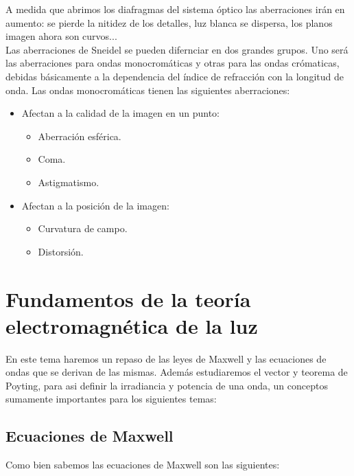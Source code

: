 \documentclass[12pt,a4paper]{article}
\numberwithin{equation}{section}
\numberwithin{figure}{section}
\begin{document}
A medida que abrimos los diafragmas del sistema óptico las aberraciones irán en aumento: se pierde la nitidez de los detalles, luz blanca se dispersa, los planos imagen ahora son curvos... \\

Las aberraciones de Sneidel se pueden difernciar en dos grandes grupos. Uno será las aberraciones para ondas monocromáticas y otras para las ondas crómaticas, debidas básicamente a la dependencia del índice de refracción con la longitud de onda. Las ondas monocromáticas tienen las siguientes aberraciones:

\begin{itemize}
\item Afectan a la calidad de la imagen en un punto:
\begin{itemize}
\item Aberración esférica.
\item Coma.
\item Astigmatismo.
\end{itemize}
\item Afectan a la posición de la imagen:
\begin{itemize}
\item Curvatura de campo.
\item Distorsión.
\end{itemize}
\end{itemize}

\newpage

\section{Fundamentos de la teoría electromagnética de la luz}

En este tema haremos un repaso de las leyes de Maxwell y las ecuaciones de ondas que se derivan de las mismas. Además estudiaremos el vector y teorema de Poyting, para asi definir la irradiancia y potencia de una onda, un conceptos sumamente importantes para los siguientes temas:

\subsection{Ecuaciones de Maxwell}

Como bien sabemos las ecuaciones de Maxwell son las siguientes:
\end{document}
